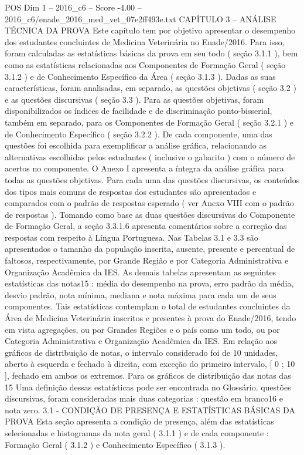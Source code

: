 \begin{textsample}{POS Dim 1 – 2016\_c6 – Score -4.00 – 2016\_c6/enade\_2016\_med\_vet\_07e2ff493e.txt}  \label{ex:f1_pos_395}
CAPÍTULO 3 – ANÁLISE TÉCNICA DA PROVA Este capítulo tem por objetivo apresentar o desempenho dos estudantes concluintes de Medicina Veterinária no Enade/2016.
Para isso, foram calculadas as estatísticas básicas da prova em seu todo ( seção 3.1.1 ), bem como as estatísticas relacionadas aos Componentes de Formação Geral ( seção 3.1.2 ) e de Conhecimento Específico da Área ( seção 3.1.3 ).
Dadas as suas características, foram analisadas, em separado, as questões objetivas ( seção 3.2 ) e as questões discursivas ( seção 3.3 ).
Para as questões objetivas, foram disponibilizados os índices de facilidade e de discriminação ponto-bisserial, também em separado, para os Componentes de Formação Geral ( seção 3.2.1 ) e de Conhecimento Específico ( seção 3.2.2 ).
De cada componente, uma das questões foi escolhida para exemplificar a análise gráfica, relacionando as alternativas escolhidas pelos estudantes ( inclusive o gabarito ) com o número de acertos no componente.
O Anexo I apresenta a íntegra da análise gráfica para todas as questões objetivas.
Para cada uma das questões discursivas, os conteúdos dos tipos mais comuns de respostas dos estudantes são apresentados e comparados com o padrão de respostas esperado ( ver Anexo VIII com o padrão de respostas ).
Tomando como base as duas questões discursivas do Componente de Formação Geral, a seção 3.3.1.6 apresenta comentários sobre a correção das respostas com respeito à Língua Portuguesa.
Nas Tabelas 3.1 e 3.3 são apresentados o tamanho da população inscrita, ausente, presente e percentual de faltosos, respectivamente, por Grande Região e por Categoria Administrativa e Organização Acadêmica da IES.
As demais tabelas apresentam as seguintes estatísticas das notas15 : média do desempenho na prova, erro padrão da média, desvio padrão, nota mínima, mediana e nota máxima para cada um de seus componentes.
Tais estatísticas contemplam o total de estudantes concluintes da Área de Medicina Veterinária inscritos e presentes à prova do Enade/2016, tendo em vista agregações, ou por Grandes Regiões e o país como um todo, ou por Categoria Administrativa e Organização Acadêmica da IES.
Em relação aos gráficos de distribuição de notas, o intervalo considerado foi de 10 unidades, aberto à esquerda e fechado à direita, com exceção do primeiro intervalo, [ 0 ; 10 ], fechado em ambos os extremos.
Para os gráficos de distribuição das notas das 15 Uma definição dessas estatísticas pode ser encontrada no Glossário. questões discursivas, foram consideradas mais duas categorias : questão em branco16 e nota zero. 3.1 - CONDIÇÃO DE PRESENÇA E ESTATÍSTICAS BÁSICAS DA PROVA Esta seção apresenta a condição de presença, além das estatísticas selecionadas e histogramas da nota geral ( 3.1.1 ) e de cada componente : Formação Geral ( 3.1.2 ) e Conhecimento Específico ( 3.1.3 ).

\end{textsample}

